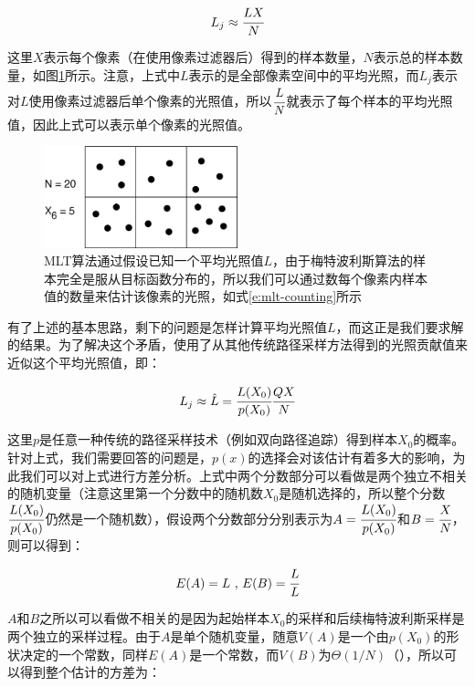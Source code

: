 \begin{equation}\label{e:mlt-counting}
	L_j\approx \cfrac{{L}X}{N}
\end{equation}

\noindent 这里$X$表示每个像素（在使用像素过滤器后）得到的样本数量，$N$表示总的样本数量，如图\ref{f:mlt-mlt-counting}所示。注意，上式中${L}$表示的是全部像素空间中的平均光照，而$L_j$表示对$L$使用像素过滤器后单个像素的光照值，所以$ \cfrac{{L}}{N}$就表示了每个样本的平均光照值，因此上式可以表示单个像素的光照值。

\begin{figure}
	\sidecaption
	\includegraphics[width=0.5\textwidth]{figures/mlt/mlt-counting}
	\caption{MLT算法通过假设已知一个平均光照值${L}$，由于梅特波利斯算法的样本完全是服从目标函数分布的，所以我们可以通过数每个像素内样本值的数量来估计该像素的光照，如式\ref{e:mlt-counting}所示}
	\label{f:mlt-mlt-counting}
\end{figure}

有了上述的基本思路，剩下的问题是怎样计算平均光照值${L}$，而这正是我们要求解的结果。为了解决这个矛盾，\cite{a:MetropolisLightTransport}使用了从其他传统路径采样方法得到的光照贡献值来近似这个平均光照值，即：

\begin{equation}\label{e:mlt-unbiased}
	L_j\approx\hat{L}= \cfrac{L(X_0)}{p(X_0)} \cfrac{QX}{N}
\end{equation}

这里$p$是任意一种传统的路径采样技术（例如双向路径追踪）得到样本$X_0$的概率。针对上式，我们需要回答的问题是，$p(x)$的选择会对该估计有着多大的影响，为此我们可以对上式进行方差分析。上式中两个分数部分可以看做是两个独立不相关的随机变量（注意这里第一个分数中的随机数$X_0$是随机选择的，所以整个分数$ \cfrac{L(X_0)}{p(X_0)}$仍然是一个随机数），假设两个分数部分分别表示为$A= \cfrac{L(X_0)}{p(X_0)}$和$B= \cfrac{X}{N}$，则可以得到：

\begin{equation}
	E(A)={L}\text{ , }
	E(B)= \cfrac{L}{{L}}
\end{equation}

$A$和$B$之所以可以看做不相关的是因为起始样本$X_0$的采样和后续梅特波利斯采样是两个独立的采样过程。由于$A$是单个随机变量，随意$V(A)$是一个由$p(X_0)$的形状决定的一个常数，同样$E(A)$是一个常数，而$V(B)$为$\Theta(1/N)$（\cite{a:AVarianceAnalysisoftheMetropolisLightTransportAlgorithm}），所以可以得到整个估计的方差为：

